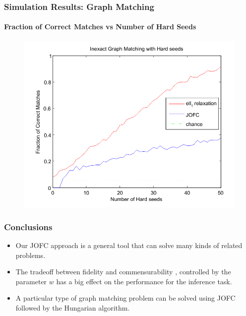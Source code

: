 \documentclass{beamer}
\begin{document}
\begin{frame}
  \frametitle{Simulation Results: Graph Matching}
  \framesubtitle{Fraction of Correct Matches vs Number of Hard Seeds}

  \begin{center}
  \begin{figure}
  	
   \includegraphics[angle=0,scale=0.45]{graphmatchJOFC.pdf}
    
  \end{figure} 
  \end{center}

\end{frame}



\begin{frame}
  \frametitle{Conclusions}
	\begin{itemize}  
      \item Our JOFC approach is a general tool that can solve many kinds of related problems.
	   \item The tradeoff between fidelity and commensurability , controlled by the parameter $w$ has a big effect on the performance for the inference task.
       \item A particular type of graph matching problem can be solved using JOFC followed by the Hungarian algorithm.
	\end{itemize}



\end{frame}
\end{document}

